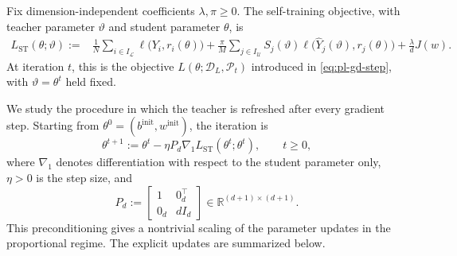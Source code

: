 Fix dimension-independent coefficients $\lambda,\pi\ge0$.
The self-training objective, with teacher parameter
$\vartheta$ and student parameter $\theta$, is
\begin{align}
    L_{\mathrm{ST}}(\theta;\vartheta)
    :=
    &\frac1N\sum_{i\in I_{\mathcal L}}
        \ell\bigl(Y_i,r_i(\theta)\bigr)
    +
    \frac{\pi}{M}\sum_{j\in I_{\mathcal U}}
        S_j(\vartheta)
        \ell\bigl(\widehat Y_j(\vartheta),r_j(\theta)\bigr)
    +
    \frac{\lambda}{d}J(w).
    \label{eq:ST-objective}
\end{align}
At iteration $t$, this is the objective
$L(\theta;\mathcal D_L,\mathcal P_t)$ introduced in
\eqref{eq:pl-gd-step}, with
$\vartheta=\theta^t$ held fixed.

We study the procedure in which the teacher is refreshed
after every gradient step. Starting from
$\theta^0=(b^{\mathrm{init}},w^{\mathrm{init}})$,
the iteration is
\begin{equation}
    \theta^{t+1}
    :=
    \theta^t-\eta P_d
    \nabla_1L_{\mathrm{ST}}(\theta^t;\theta^t),
    \qquad t\ge0,
    \label{eq:ST-recursion}
\end{equation}
where $\nabla_1$ denotes differentiation with respect
to the student parameter only, $\eta>0$ is the step size,
and
\[
    P_d
    :=
    \begin{bmatrix}
        1 & 0_d^\top\\
        0_d & dI_d
    \end{bmatrix}
    \in\mathbb R^{(d+1)\times(d+1)}.
\]
This preconditioning gives a nontrivial scaling of the
parameter updates in the proportional regime.
The explicit updates are summarized below.

